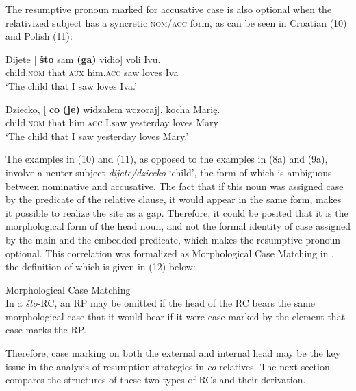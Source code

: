 \documentclass[output=paper]{langsci/langscibook}
\begin{document}
The resumptive pronoun marked for accusative case is also optional when the relativized subject has a syncretic \textsc{nom\slash acc} form, as can be seen in Croatian (10) and Polish (11): 

\ea%
    \label{ex:leska:10}
    \gll Dijete   [ \textbf{što} sam \textbf{(ga)}   vidio]   voli   Ivu.\\
         child.\textsc{nom} {}  that \textsc{aux} him.\textsc{acc}   saw   loves   Iva\\
    \glt ‘The child that I saw loves Iva.’
    \z

\ea%
    \label{ex:leska:11}
    \gll Dziecko, [ \textbf{co} \textbf{(je)}   widzałem   wczoraj],   kocha   Marię.\\
         child.\textsc{nom} {} that him.\textsc{acc}  I.saw   yesterday   loves   Mary\\
    \glt ‘The child that I saw yesterday loves Mary.’
    \z

The examples in (10) and (11), as opposed to the examples in (8a) and (9a), involve a neuter subject \textit{dijete\slash dziecko} ‘child’, the form of which is ambiguous between nominative and accusative. The fact that if this noun was assigned case by the predicate of the relative clause, it would appear in the same form, makes it possible to realize the  site as a gap. Therefore, it could be posited that it is the morphological form of the head noun, and not the formal identity of case assigned by the main and the embedded predicate, which makes the resumptive pronoun optional. This correlation was formalized as Morphological Case Matching in \citet[30]{Gračanin-Yuksek2013}, the definition of which is given in (12) below: 

\ea%
    \label{ex:leska:12}
Morphological Case Matching\\
In a \textit{što}{}-RC, an RP may be omitted if the head of the RC bears the same morphological case that it would bear if it were case marked by the element that case-marks the RP.
    \z

Therefore, case marking on both the external and internal head may be the key issue in the analysis of resumption strategies in \textit{co}{}-relatives. The next section compares the structures of these two types of RCs and their derivation.
\end{document}
